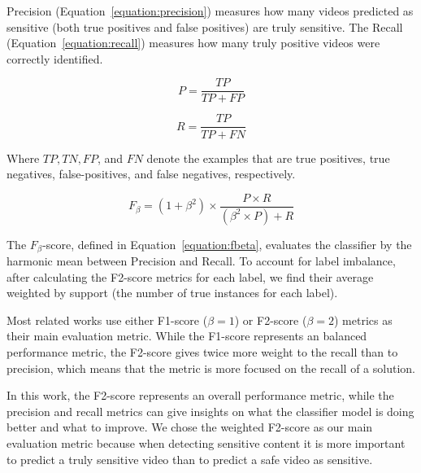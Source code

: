 
Precision (Equation~\ref{equation:precision}) measures how many videos predicted as sensitive (both true positives and false positives) are truly sensitive. The Recall (Equation~\ref{equation:recall})  measures how many truly positive videos were correctly identified.

\begin{multicols}{2}
  \begin{equation}
    \label{equation:precision}
    P = \frac{TP}{TP + FP}
  \end{equation}

  \begin{equation}
    \label{equation:recall}
    R = \frac{TP}{TP + FN}
  \end{equation}
  
\end{multicols}

Where $TP, TN, FP$, and $FN$ denote the examples that are true positives, true negatives, false-positives, and false negatives, respectively.

\begin{equation}
\label{equation:fbeta}
F_\beta = (1+\beta^2) \times \frac{P \times R}{(\beta^2 \times P) + R}
\end{equation}

The $F_\beta$-score, defined in Equation~\ref{equation:fbeta}, evaluates the classifier by the harmonic mean between Precision and Recall. To account for label imbalance, after calculating the F2-score metrics for each label, we find their average weighted by support (the number of true instances for each label). 

Most related works use either F1-score ($\beta=1$) or F2-score ($\beta=2$) metrics as their main evaluation metric. While the F1-score represents an balanced performance metric, the F2-score gives twice more weight to the recall than to precision, which means that the metric is more focused on the recall of a solution.

In this work, the F2-score represents an overall performance metric, while the precision and recall metrics can give insights on what the classifier model is doing better and what to improve. We chose the weighted F2-score as our main evaluation metric because when detecting sensitive content it is more important to predict a truly sensitive video than to predict a safe video as sensitive.

